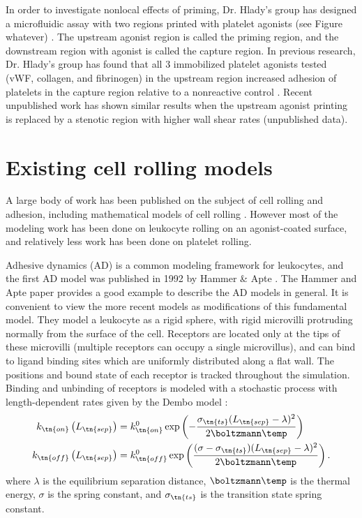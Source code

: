 In order to investigate nonlocal effects of priming, Dr. Hlady's group
has designed a microfluidic assay with two regions printed with
platelet agonists (see Figure whatever) \cite{Corum2012}. The upstream
agonist region is called the priming region, and the downstream region
with agonist is called the capture region. In previous research,
Dr. Hlady's group has found that all 3 immobilized platelet agonists
tested (vWF, collagen, and fibrinogen) in the upstream region
increased adhesion of platelets in the capture region relative to a
nonreactive control \cite{Eichinger2016}. Recent unpublished work has
shown similar results when the upstream agonist printing is replaced
by a stenotic region with higher wall shear rates (unpublished data).

\section{Existing cell rolling models}
\label{sec:exist-cell-roll}

A large body of work has been published on the subject of cell rolling
and adhesion, including mathematical models of cell rolling
\cite{Pospieszalska2009,Sundd2011}. However most of the modeling work
has been done on leukocyte rolling on an agonist-coated surface, and
relatively less work has been done on platelet rolling.

Adhesive dynamics (AD) is a common modeling framework for leukocytes,
and the first AD model was published in 1992 by Hammer \& Apte
\cite{Hammer1992}. The Hammer and Apte paper provides a good example
to describe the AD models in general. It is convenient to view the
more recent models as modifications of this fundamental model. They
model a leukocyte as a rigid sphere, with rigid microvilli protruding
normally from the surface of the cell. Receptors are located only at
the tips of these microvilli (multiple receptors can occupy a single
microvillus), and can bind to ligand binding sites which are uniformly
distributed along a flat wall. The positions and bound state of each
receptor is tracked throughout the simulation. Binding and unbinding
of receptors is modeled with a stochastic process with
length-dependent rates given by the Dembo model \cite{Dembo1988}:
\begin{align}
  \label{eq:dembo-on}
  k_\tn{on} \left(L_\tn{sep}\right)
  &= k_\tn{on}^0 \exp \left( -\frac{\sigma_\tn{ts} (L_\tn{sep} -
    \lambda)^2}{2\boltzmann \temp} \right) \\
  \label{eq:dembo-off}
  k_\tn{off} \left(L_\tn{sep}\right)
  &= k_\tn{off}^0 \exp \left( \frac{(\sigma - \sigma_\tn{ts})
    (L_\tn{sep} - \lambda)^2}{2 \boltzmann \temp} \right).
\end{align}
where $\lambda$ is the equilibrium separation distance,
$\boltzmann\temp$ is the thermal energy, $\sigma$ is the spring
constant, and $\sigma_\tn{ts}$ is the transition state spring
constant.

